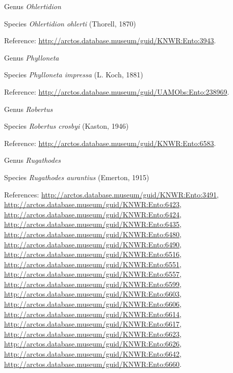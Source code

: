 \documentclass[9pt, article]{memoir}
\begin{document}
\begin{multicols}{2}
\vspace{6pt}\noindent\hspace{30pt}Genus \textit{Ohlertidion}


\vspace{6pt}\noindent\hspace{36pt}Species \textit{Ohlertidion ohlerti} (Thorell, 1870)


\vspace{6pt}Reference: 
\url{http://arctos.database.museum/guid/KNWR:Ento:3943}.

\vspace{6pt}\noindent\hspace{30pt}Genus \textit{Phylloneta}


\vspace{6pt}\noindent\hspace{36pt}Species \textit{Phylloneta impressa} (L. Koch, 1881)


\vspace{6pt}Reference: 
\url{http://arctos.database.museum/guid/UAMObs:Ento:238969}.

\vspace{6pt}\noindent\hspace{30pt}Genus \textit{Robertus}


\vspace{6pt}\noindent\hspace{36pt}Species \textit{Robertus crosbyi} (Kaston, 1946)


\vspace{6pt}Reference: 
\url{http://arctos.database.museum/guid/KNWR:Ento:6583}.

\vspace{6pt}\noindent\hspace{30pt}Genus \textit{Rugathodes}


\vspace{6pt}\noindent\hspace{36pt}Species \textit{Rugathodes aurantius} (Emerton, 1915)


\vspace{6pt}References: 
\url{http://arctos.database.museum/guid/KNWR:Ento:3491}, 
\url{http://arctos.database.museum/guid/KNWR:Ento:6423}, 
\url{http://arctos.database.museum/guid/KNWR:Ento:6424}, 
\url{http://arctos.database.museum/guid/KNWR:Ento:6435}, 
\url{http://arctos.database.museum/guid/KNWR:Ento:6480}, 
\url{http://arctos.database.museum/guid/KNWR:Ento:6490}, 
\url{http://arctos.database.museum/guid/KNWR:Ento:6516}, 
\url{http://arctos.database.museum/guid/KNWR:Ento:6551}, 
\url{http://arctos.database.museum/guid/KNWR:Ento:6557}, 
\url{http://arctos.database.museum/guid/KNWR:Ento:6599}, 
\url{http://arctos.database.museum/guid/KNWR:Ento:6603}, 
\url{http://arctos.database.museum/guid/KNWR:Ento:6606}, 
\url{http://arctos.database.museum/guid/KNWR:Ento:6614}, 
\url{http://arctos.database.museum/guid/KNWR:Ento:6617}, 
\url{http://arctos.database.museum/guid/KNWR:Ento:6623}, 
\url{http://arctos.database.museum/guid/KNWR:Ento:6626}, 
\url{http://arctos.database.museum/guid/KNWR:Ento:6642}, 
\url{http://arctos.database.museum/guid/KNWR:Ento:6660}.


\end{multicols}
\end{document}
